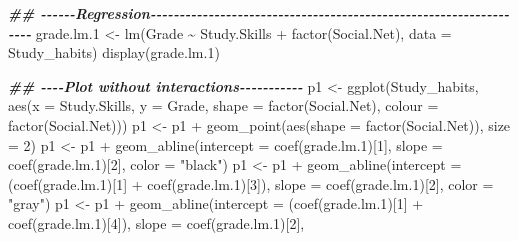 \documentclass[
]{gitbook}
\newenvironment{Shaded}{\begin{snugshade}}{\end{snugshade}}
\newcommand{\AttributeTok}[1]{\textcolor[rgb]{0.77,0.63,0.00}{#1}}
\newcommand{\DecValTok}[1]{\textcolor[rgb]{0.00,0.00,0.81}{#1}}
\newcommand{\DocumentationTok}[1]{\textcolor[rgb]{0.56,0.35,0.01}{\textbf{\textit{#1}}}}
\newcommand{\FloatTok}[1]{\textcolor[rgb]{0.00,0.00,0.81}{#1}}
\newcommand{\FunctionTok}[1]{\textcolor[rgb]{0.00,0.00,0.00}{#1}}
\newcommand{\NormalTok}[1]{#1}
\newcommand{\OtherTok}[1]{\textcolor[rgb]{0.56,0.35,0.01}{#1}}
\newcommand{\SpecialCharTok}[1]{\textcolor[rgb]{0.00,0.00,0.00}{#1}}
\newcommand{\StringTok}[1]{\textcolor[rgb]{0.31,0.60,0.02}{#1}}
\begin{document}
\begin{Shaded}
\begin{Highlighting}[]
\DocumentationTok{\#\# {-}{-}{-}{-}{-}{-}Regression{-}{-}{-}{-}{-}{-}{-}{-}{-}{-}{-}{-}{-}{-}{-}{-}{-}{-}{-}{-}{-}{-}{-}{-}{-}{-}{-}{-}{-}{-}{-}{-}{-}{-}{-}{-}{-}{-}{-}{-}{-}{-}{-}{-}{-}{-}{-}{-}{-}{-}{-}{-}{-}{-}{-}{-}{-}{-}{-}{-}{-}{-}{-}{-}{-}{-}}
\NormalTok{grade.lm}\FloatTok{.1} \OtherTok{\textless{}{-}} \FunctionTok{lm}\NormalTok{(Grade }\SpecialCharTok{\textasciitilde{}}\NormalTok{ Study.Skills }\SpecialCharTok{+} \FunctionTok{factor}\NormalTok{(Social.Net), }\AttributeTok{data =}\NormalTok{ Study\_habits)}
\FunctionTok{display}\NormalTok{(grade.lm}\FloatTok{.1}\NormalTok{)}

\DocumentationTok{\#\# {-}{-}{-}{-}Plot without interactions{-}{-}{-}{-}{-}{-}{-}{-}{-}{-}{-}}
\NormalTok{p1 }\OtherTok{\textless{}{-}} \FunctionTok{ggplot}\NormalTok{(Study\_habits, }\FunctionTok{aes}\NormalTok{(}\AttributeTok{x =}\NormalTok{ Study.Skills, }\AttributeTok{y =}\NormalTok{ Grade, }\AttributeTok{shape =} \FunctionTok{factor}\NormalTok{(Social.Net),}
    \AttributeTok{colour =} \FunctionTok{factor}\NormalTok{(Social.Net)))}
\NormalTok{p1 }\OtherTok{\textless{}{-}}\NormalTok{ p1 }\SpecialCharTok{+} \FunctionTok{geom\_point}\NormalTok{(}\FunctionTok{aes}\NormalTok{(}\AttributeTok{shape =} \FunctionTok{factor}\NormalTok{(Social.Net)), }\AttributeTok{size =} \DecValTok{2}\NormalTok{)}
\NormalTok{p1 }\OtherTok{\textless{}{-}}\NormalTok{ p1 }\SpecialCharTok{+} \FunctionTok{geom\_abline}\NormalTok{(}\AttributeTok{intercept =} \FunctionTok{coef}\NormalTok{(grade.lm}\FloatTok{.1}\NormalTok{)[}\DecValTok{1}\NormalTok{], }\AttributeTok{slope =} \FunctionTok{coef}\NormalTok{(grade.lm}\FloatTok{.1}\NormalTok{)[}\DecValTok{2}\NormalTok{],}
    \AttributeTok{color =} \StringTok{"black"}\NormalTok{)}
\NormalTok{p1 }\OtherTok{\textless{}{-}}\NormalTok{ p1 }\SpecialCharTok{+} \FunctionTok{geom\_abline}\NormalTok{(}\AttributeTok{intercept =}\NormalTok{ (}\FunctionTok{coef}\NormalTok{(grade.lm}\FloatTok{.1}\NormalTok{)[}\DecValTok{1}\NormalTok{] }\SpecialCharTok{+} \FunctionTok{coef}\NormalTok{(grade.lm}\FloatTok{.1}\NormalTok{)[}\DecValTok{3}\NormalTok{]), }\AttributeTok{slope =} \FunctionTok{coef}\NormalTok{(grade.lm}\FloatTok{.1}\NormalTok{)[}\DecValTok{2}\NormalTok{],}
    \AttributeTok{color =} \StringTok{"gray"}\NormalTok{)}
\NormalTok{p1 }\OtherTok{\textless{}{-}}\NormalTok{ p1 }\SpecialCharTok{+} \FunctionTok{geom\_abline}\NormalTok{(}\AttributeTok{intercept =}\NormalTok{ (}\FunctionTok{coef}\NormalTok{(grade.lm}\FloatTok{.1}\NormalTok{)[}\DecValTok{1}\NormalTok{] }\SpecialCharTok{+} \FunctionTok{coef}\NormalTok{(grade.lm}\FloatTok{.1}\NormalTok{)[}\DecValTok{4}\NormalTok{]), }\AttributeTok{slope =} \FunctionTok{coef}\NormalTok{(grade.lm}\FloatTok{.1}\NormalTok{)[}\DecValTok{2}\NormalTok{],}

\end{Highlighting}
\end{Shaded}
\end{document}
